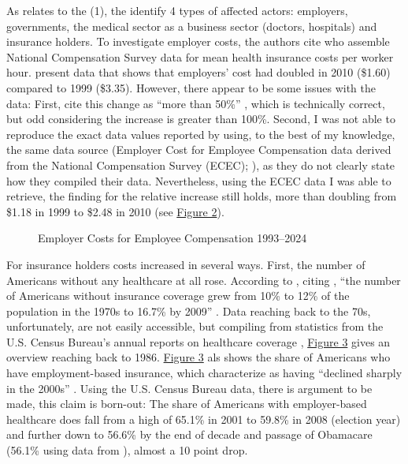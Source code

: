 \documentclass[11pt]{article}
\begin{document}
As relates to the (1), the identify 4 types of affected actors: employers, governments, the medical sector as a business sector (doctors, hospitals) and insurance holders. To investigate employer costs, the authors cite \textcite[][]{Claxton2011} who assemble National Compensation Survey data for mean health insurance costs per worker hour. \textcite[][]{Claxton2011} present data that shows that employers' cost had doubled in 2010 (\$1.60) compared to 1999 (\$3.35). However, there appear to be some issues with the data: First, \textcite[][]{Jacobs2014} cite this change as \enquote{more than 50\%} , which is technically correct, but odd considering the increase is greater than 100\%. Second, I was not able to reproduce the exact data values reported by \textcite[][]{Claxton2011} using, to the best of my knowledge, the same data source (Employer Cost for Employee Compensation data derived from the National Compensation Survey (ECEC); ), as they do not clearly state how they compiled their data. Nevertheless, using the ECEC data I was able to retrieve, the finding for the relative increase still holds, more than doubling from \$1.18 in 1999 to \$2.48 in 2010 (see \hyperref[fig:ecec]{Figure 2}).

\begin{figure}[H]
  \sffamily
  \caption{Employer Costs for Employee Compensation 1993--2024}
  
  \label{fig:ecec}
\end{figure}

\noindent For insurance holders costs increased in several ways. First, the number of Americans without any healthcare at all rose. According to \textcite[][]{Jacobs2014}, citing \textcite[][]{Starr2011}, \enquote{the number of Americans without insurance coverage grew from 10\% to 12\% of the population in the 1970s to 16.7\% by 2009} \parencite[p. 451-452]{Jacobs2014}. Data reaching back to the 70s, unfortunately, are not easily accessible, but compiling from statistics from the U.S. Census Bureau's annual reports on healthcare coverage \parencites{Census2013}[see the supplemental matieral of][note that the methdology of these studies has been slightly adjusted over-time somewhat limiting comparability between the two study periods]{Census2024}, \hyperref[fig:emp_un]{Figure 3} gives an overview reaching back to 1986. \hyperref[fig:emp_un]{Figure 3} als shows the share of Americans who have employment-based insurance, which \textcite[][]{Jacobs2014} characterize as having \enquote{declined sharply in the 2000s} . Using the U.S. Census Bureau data, there is argument to be made, this claim is born-out: The share of Americans with employer-based healthcare does fall from a high of 65.1\% in 2001 to 59.8\% in 2008 (election year) and further down to 56.6\% by the end of decade and passage of Obamacare (56.1\% using data from ), almost a 10 point drop.
\end{document}
